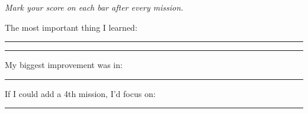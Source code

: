 {\begin{tcolorbox}
\smallskip
\textcolor{funGray}{\small\itshape Mark your score on each bar after every mission.}
\end{tcolorbox}

\vspace{3mm}

\begin{tcolorbox}[
    enhanced,
    colback=funOrange!5,
    colframe=funOrange!25,
    arc=10pt, boxrule=0.8pt,
    left=5mm, right=5mm, top=3mm, bottom=3mm,
    title={\faClipboardCheck~Final Debrief},
    colbacktitle=funOrange!12,
    coltitle=black,
    fonttitle=\bfseries\sffamily,
]
    \small
    The most important thing I learned: \rule{8cm}{0.3pt}

    \vspace{2mm}
    \rule{\linewidth}{0.3pt}

    \vspace{2mm}
    My biggest improvement was in: \rule{8.5cm}{0.3pt}

    \vspace{2mm}
    If I could add a 4th mission, I'd focus on: \rule{6.5cm}{0.3pt}
\end{tcolorbox}

}

\newpage
